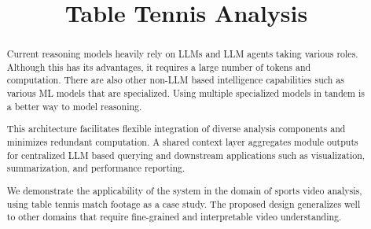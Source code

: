 \documentclass[conference]{IEEEtran}
\begin{document}
\title{Table Tennis Analysis}

\author{
\and
{}
\and
{}
\and
{}
\and
{}
}


\maketitle

\begin{abstract}
Current reasoning models heavily rely on LLMs and LLM agents taking various roles. Although this has its advantages, it requires a large number of tokens and computation. There are also other non-LLM based intelligence capabilities such as various ML models that are specialized. Using multiple specialized models in tandem is a better way to model reasoning.

This architecture facilitates flexible integration of diverse analysis components and minimizes redundant computation. A shared context layer aggregates module outputs for centralized LLM based querying and downstream applications such as visualization, summarization, and performance reporting.

We demonstrate the applicability of the system in the domain of sports video analysis, using table tennis match footage as a case study. The proposed design generalizes well to other domains that require fine-grained and interpretable video understanding.
\end{abstract}
\end{document}

